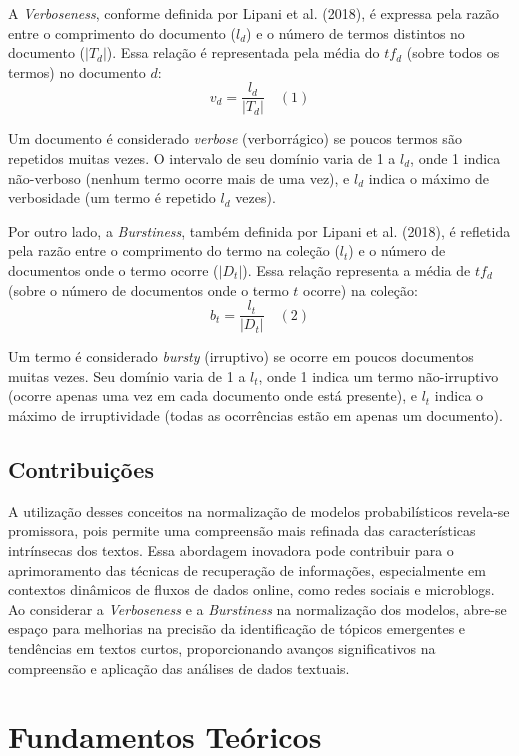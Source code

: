 \documentclass[runningheads]{llncs}
\begin{document}
A \textit{Verboseness}, conforme definida por Lipani et al. (2018), é expressa pela razão entre o comprimento do documento (\(l_d\)) e o número de termos distintos no documento (\(|T_d|\)). Essa relação é representada pela média do \(tf_d\) (sobre todos os termos) no documento \(d\):
\[ v_d = \frac{l_d}{|T_d|} \quad (1)\]

Um documento é considerado \textit{verbose} (verborrágico) se poucos termos são repetidos muitas vezes. O intervalo de seu domínio varia de 1 a \(l_d\), onde 1 indica não-verboso (nenhum termo ocorre mais de uma vez), e \(l_d\) indica o máximo de verbosidade (um termo é repetido \(l_d\) vezes).

Por outro lado, a \textit{Burstiness}, também definida por Lipani et al. (2018), é refletida pela razão entre o comprimento do termo na coleção (\(l_t\)) e o número de documentos onde o termo ocorre (\(|D_t|\)). Essa relação representa a média de \(tf_d\) (sobre o número de documentos onde o termo \(t\) ocorre) na coleção:
\[ b_t = \frac{l_t}{|D_t|} \quad (2)\]

Um termo é considerado \textit{bursty} (irruptivo) se ocorre em poucos documentos muitas vezes. Seu domínio varia de 1 a \(l_t\), onde 1 indica um termo não-irruptivo (ocorre apenas uma vez em cada documento onde está presente), e \(l_t\) indica o máximo de irruptividade (todas as ocorrências estão em apenas um documento).

\subsection{Contribuições}
A utilização desses conceitos na normalização de modelos probabilísticos revela-se promissora, pois permite uma compreensão mais refinada das características intrínsecas dos textos. Essa abordagem inovadora pode contribuir para o aprimoramento das técnicas de recuperação de informações, especialmente em contextos dinâmicos de fluxos de dados online, como redes sociais e microblogs. Ao considerar a \textit{Verboseness} e a \textit{Burstiness} na normalização dos modelos, abre-se espaço para melhorias na precisão da identificação de tópicos emergentes e tendências em textos curtos, proporcionando avanços significativos na compreensão e aplicação das análises de dados textuais.

\section{Fundamentos Teóricos}
\end{document}
